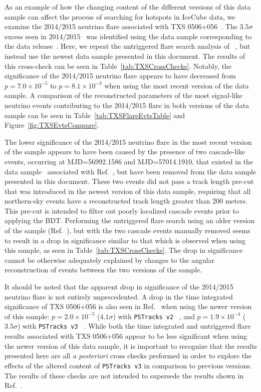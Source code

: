 \documentclass[aps,10pt,prd,twocolumn,floats,letterpaper,showpacs,nofootinbib,bibnotes,notitlepage,superscriptaddress,floatfix]{revtex4-1}
\newcommand{\MA}[1]{{\color{black}#1}}
\begin{document}
As an example of how the changing content of the different versions of this data sample can affect the process of searching for hotspots in IceCube data, we examine the 2014/2015 neutrino flare associated with TXS 0506+056~\cite{IceCube:2018cha}. The $3.5 \sigma$ excess seen in 2014/2015~\cite{IceCube:2018cha} was identified using the data sample corresponding to the data release~\cite{IceCube:2019}. Here, we repeat the untriggered flare search analysis of ~\cite{IceCube:2018cha}, but instead use the newest data sample presented in this document. The results of this cross-check can be seen in Table~\ref{tab:TXSCrossChecks}. Notably, the significance of the 2014/2015 neutrino flare appears to have decreased from $p=7.0 \times 10^{-5}$ to $p=8.1 \times 10^{-3}$ when using the most recent version of the data sample. A comparison of the reconstructed parameters of the most signal-like neutrino events contributing to the 2014/2015 flare in both versions of the data sample can be seen in Table~\ref{tab:TXSFlareEvtsTable} and Figure~\ref{fig:TXSEvtsCompare}.

The lower significance of the 2014/2015 neutrino flare in the most recent version of the sample appears to have been caused by the presence of two cascade-like events, occurring at MJD=56992.1586 and MJD=57014.1910, that existed in the data sample~\cite{IceCube:2019} associated with Ref.~\cite{IceCube:2018cha}, but have been removed from the data sample presented in this document. These two events did not pass a track length pre-cut that was introduced in the newest version of this data sample, requiring that all northern-sky events have a reconstructed track length greater than 200 meters. This pre-cut is intended to filter out poorly localized cascade events prior to applying the BDT. Performing the untriggered flare search using an older version of the sample (Ref.~\cite{IceCube:2019}), but with the two cascade events manually removed seems to result in a drop in significance similar to that which is observed when using this sample, as seen in Table~\ref{tab:TXSCrossChecks}. The drop in significance cannot be otherwise adequately explained by changes to the angular reconstruction of events between the two versions of the sample. 

 It should be noted that the apparent drop in significance of the 2014/2015 neutrino flare is not entirely unprecedented. A drop in the time integrated significance of TXS 0506+056 is also seen in Ref.~\cite{Aartsen:2019fau} when using the newer version of this sample: $p=2.0 \times 10^{-5}$ ($4.1\sigma$) with \MA{\tt PSTracks v2} ~\cite{IceCube:2018cha}, and $p=1.9 \times 10^{-4}$ ($3.5\sigma$) with \MA{\tt PSTracks v3} ~\cite{Aartsen:2019fau}. While both the time integrated and untriggered flare results associated with TXS 0506+056 appear to be less significant when using the newer version of this data sample, it is important to recognize that the results presented here are all \textit{a posteriori} cross checks preformed in order to explore the effects of the altered content of \MA{\tt PSTracks v3} in comparison to previous versions. The results of these checks are not intended to supersede the results shown in Ref.~\cite{IceCube:2018cha}.
\end{document}
